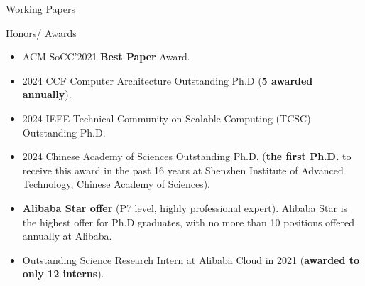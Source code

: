 \documentclass{resume} %
\begin{document}
\begin{rSection}{Working Papers}
\vspace{-1em}
\begin{rSection}{Honors/ Awards}
\begin{itemize}
    \setlength{\leftmargin}{0em}
    \setlength{\itemsep}{0.2em}
    \setlength{\parskip}{0pt}
  \item ACM SoCC'2021 \textbf{Best Paper} Award.
  \item 2024 CCF Computer Architecture Outstanding Ph.D (\textbf{5 awarded annually}).
  \item 2024 IEEE Technical Community on Scalable Computing (TCSC) Outstanding Ph.D.
  \item 2024 Chinese Academy of Sciences Outstanding Ph.D. (\textbf{the first Ph.D.} to receive this award in the past 16 years at Shenzhen Institute of Advanced Technology, Chinese Academy of Sciences).
  \item \textbf{Alibaba Star offer} (P7 level, highly professional expert). Alibaba Star is the highest offer for Ph.D graduates, with no more than 10 positions offered annually at Alibaba. 
  \item Outstanding Science Research Intern at Alibaba Cloud in 2021 (\textbf{awarded to only 12 interns}).


\end{itemize}
\end{rSection}
\end{rSection}
\end{document}
